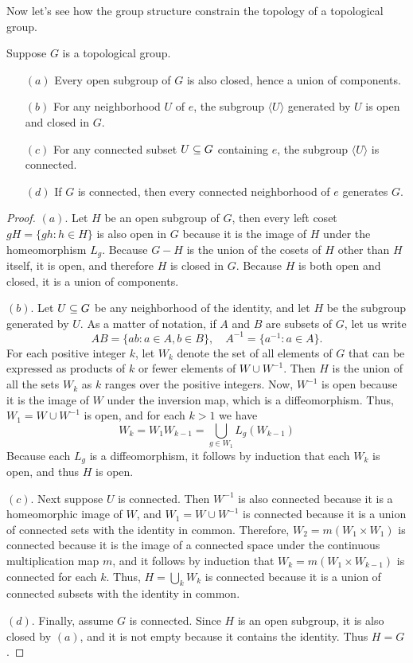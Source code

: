 Now let's see how the group structure constrain the topology of a topological group.
\begin{proposition}\label{topo group prop}
Suppose $G$ is a topological group.
\begin{itemize}
\item[$(a)$] Every open subgroup of $G$ is also closed, hence a union of components.
\item[$(b)$] For any neighborhood $U$ of $e$, the subgroup $\langle U\rangle$ generated by $U$ is open and closed in $G$.
\item[$(c)$] For any connected subset $U\subseteq G$ containing $e$, the subgroup $\langle U\rangle$ is connected.
\item[$(d)$] If $G$ is connected, then every connected neighborhood of $e$ generates $G$.
\end{itemize}
\end{proposition}
\begin{proof}
$(a)$. Let $H$ be an open subgroup of $G$, then every left coset $gH=\{gh:h\in H\}$ is also open in $G$ because it is the image of $H$ under the homeomorphism $L_g$. Because $G-H$ is the union of the cosets of $H$ other than $H$ itself, it is open, and therefore $H$ is closed in $G$. Because $H$ is both open and closed, it is a union of components.\par
$(b)$. Let $U\subseteq G$ be any neighborhood of the identity, and let $H$ be the subgroup generated by $U$. As a matter of notation, if $A$ and $B$ are subsets of $G$, let us write
\[AB=\{ab:a\in A,b\in B\},\quad A^{-1}=\{a^{-1}:a\in A\}.\]
For each positive integer $k$, let $W_k$ denote the set of all elements of $G$ that can be expressed as products of $k$ or fewer elements of $W\cup W^{-1}$. Then $H$ is the union of all the sets $W_k$ as $k$ ranges over the positive integers. Now, $W^{-1}$ is open because it is the image of $W$ under the inversion map, which is a diffeomorphism. Thus, $W_1=W\cup W^{-1}$ is open, and for each $k>1$ we have
\[W_k=W_1W_{k-1}=\bigcup_{g\in W_1}L_g(W_{k-1})\]
Because each $L_g$ is a diffeomorphism, it follows by induction that each $W_k$ is open, and thus $H$ is open.\par
$(c)$. Next suppose $U$ is connected. Then $W^{-1}$ is also connected because it is a homeomorphic image of $W$, and $W_1=W\cup W^{-1}$ is connected because it is a union of connected sets with the identity in common. Therefore, $W_2=m(W_1\times W_1)$ is connected because it is the image of a connected space under the continuous multiplication map $m$, and it follows by induction that $W_k=m(W_1\times W_{k-1})$ is connected for each $k$. Thus, $H=\bigcup_kW_k$ is connected because it is a union of connected subsets with the identity in common.\par
$(d)$. Finally, assume $G$ is connected. Since $H$ is an open subgroup, it is also closed by $(a)$, and it is not empty because it contains the identity. Thus $H=G$.
\end{proof}
